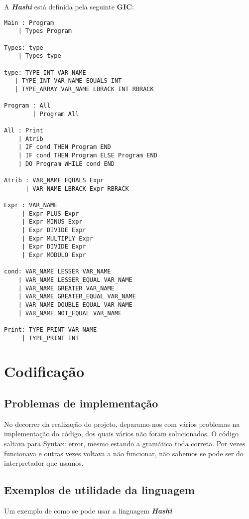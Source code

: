 \documentclass[11pt,a4paper]{report}
\begin{document}
    A \textbf{\textit{Hashi}} está definida pela seguinte \textbf{GIC}:
    
    \begin{lstlisting}
Main : Program 
    | Types Program

Types: type
    | Types type

type: TYPE_INT VAR_NAME
   | TYPE_INT VAR_NAME EQUALS INT
   | TYPE_ARRAY VAR_NAME LBRACK INT RBRACK

Program : All
        | Program All

All : Print
    | Atrib
    | IF cond THEN Program END
    | IF cond THEN Program ELSE Program END
    | DO Program WHILE cond END

Atrib : VAR_NAME EQUALS Expr
      | VAR_NAME LBRACK Expr RBRACK

Expr : VAR_NAME
     | Expr PLUS Expr
     | Expr MINUS Expr
     | Expr DIVIDE Expr
     | Expr MULTIPLY Expr
     | Expr DIVIDE Expr
     | Expr MODULO Expr

cond: VAR_NAME LESSER VAR_NAME
    | VAR_NAME LESSER_EQUAL VAR_NAME
    | VAR_NAME GREATER VAR_NAME
    | VAR_NAME GREATER_EQUAL VAR_NAME
    | VAR_NAME DOUBLE_EQUAL VAR_NAME
    | VAR_NAME NOT_EQUAL VAR_NAME

Print: TYPE_PRINT VAR_NAME
     | TYPE_PRINT INT
    \end{lstlisting}
    
    
    
	\pagebreak
    
\chapter{Codificação}

\section{Problemas de implementação}
No decorrer da realização do projeto, deparamo-nos com vários problemas na implementação do código, dos quais vários não foram solucionados. O código saltava para Syntax: error, mesmo estando a gramática toda correta. Por vezes funcionava e outras vezes voltava a não funcionar, não sabemos se pode ser do interpretador que usamos.

\section{Exemplos de utilidade da linguagem}

Um exemplo de como se pode usar a linguagem \textbf{\textit{ Hashi}}
\end{document}
